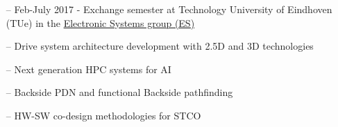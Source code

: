 \documentclass[10pt,a4paper,fancychapters]{altacv}
\begin{document}
\medskip

\begin{itemize}
    \setlength{\itemindent}{0.5em}
    \item[--] \small{Feb-July 2017 - Exchange semester at Technology University of Eindhoven (TUe) in the
    \href{https://research.tue.nl/en/organisations/electronic-systems}{Electronic Systems group (ES)}}
\end{itemize}

\medskip



\setlength{\itemindent}{0.5em}
\begin{itemize}
    \item[--] \small{Drive system architecture development with 2.5D and 3D technologies}
    \item[--] \small{Next generation HPC systems for AI}
\end{itemize}


\begin{itemize}
    \setlength{\itemindent}{0.5em}
    \item[--] \small{Backside PDN and functional Backside pathfinding}
    \item[--] \small{HW-SW co-design methodologies for STCO}
\end{itemize}

\end{document}
